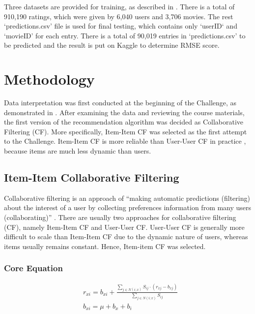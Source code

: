 \documentclass{ece}
\begin{document}
Three datasets are provided for training, as described in .
There is a total of 910,190 ratings, which were given by 6,040 users and 3,706 movies.
The rest `predictions.csv' file is used for final testing, which contains only `userID` and `movieID' for each entry.
There is a total of 90,019 entries in `predictions.csv' to be predicted and the result is put on Kaggle to determine RMSE score.


\section{Methodology}

Data interpretation was first conducted at the beginning of the Challenge, as demonstrated in .
After examining the data and reviewing the course materials, the first version of the recommendation algorithm was decided as Collaborative Filtering (CF).
More specifically, Item-Item CF was selected as the first attempt to the Challenge.
Item-Item CF is more reliable than User-User CF in practice \cite{mmds}, because items are much less dynamic than users.

\subsection{Item-Item Collaborative Filtering}
\label{item-item-cf}

Collaborative filtering is an approach of ``making automatic predictions (filtering) about the interest of a user by collecting preferences information from many users (collaborating)'' \cite{wiki_cf}.
There are usually two approaches for collaborative filtering (CF), namely Item-Item CF and User-User CF.
User-User CF is generally more difficult to scale than Item-Item CF due to the dynamic nature of users, whereas items usually remains constant.
Hence, Item-item CF was selected.

\subsubsection{Core Equation}

\begin{equation}
	\begin{aligned}\label{eq:1}
& r_{xi} = b_{xi} + \frac{\sum\limits_{j\in N(i;x)} S_{ij} \cdot (r_{xj} - b_{xj}) }{\sum\limits_{j\in N(i;x)} S_{ij}}  \\
& b_{xi} = \mu + b_x + b_i
	\end{aligned}
\end{equation}
\end{document}
